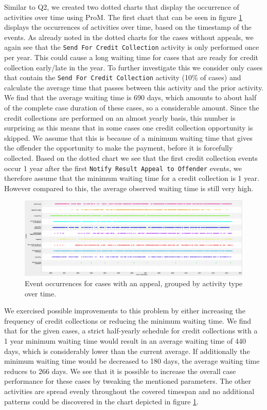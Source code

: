 \documentclass[12pt]{report}
\begin{document}
Similar to Q2, we created two dotted charts that display the occurrence of activities over time using ProM. The first chart that can be seen in figure \ref{fig:dotted_timestamp_appeals} displays the occurrences of activities over time, based on the timestamp of the events. As already noted in the dotted charts for the cases without appeals, we again see that the \texttt{Send For Credit Collection} activity is only performed once per year. This could cause a long waiting time for cases that are ready for credit collection early/late in the year. To further investigate this we consider only cases that contain the \texttt{Send For Credit Collection} activity (10\% of cases) and calculate the average time that passes between this activity and the prior activity. We find that the average waiting time is 690 days, which amounts to about half of the complete case duration of these cases, so a considerable amount. Since the credit collections are performed on an almost yearly basis, this number is surprising as this means that in some cases one credit collection opportunity is skipped. We assume that this is because of a minimum waiting time that gives the offender the opportunity to make the payment, before it is forcefully collected. Based on the dotted chart we see that the first credit collection events occur 1 year after the first \texttt{Notify Result Appeal to Offender} events, we therefore assume that the minimum waiting time for a credit collection is 1 year. However compared to this, the average observed waiting time is still very high.
\begin{figure}[H]
  \centering
  \includegraphics[width=\textwidth]{figures/dotted_timestamp_appeals.png}
  \caption{Event occurrences for cases with an appeal, grouped by activity type over time.}
  \label{fig:dotted_timestamp_appeals}
\end{figure}
We exercised possible improvements to this problem by either increasing the frequency of credit collections or reducing the minimum waiting time. We find that for the given cases, a strict half-yearly schedule for credit collections with a 1 year minimum waiting time would result in an average waiting time of 440 days, which is considerably lower than the current average. If additionally the minimum waiting time would be decreased to 180 days, the average waiting time reduces to 266 days. We see that it is possible to increase the overall case performance for these cases by tweaking the mentioned parameters. The other activities are spread evenly throughout the covered timespan and no additional patterns could be discovered in the chart depicted in figure \ref{fig:dotted_timestamp_appeals}.
\end{document}
